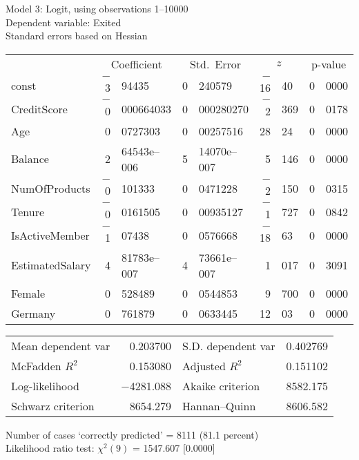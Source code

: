 \documentclass[11pt]{article}
\begin{document}
\thispagestyle{empty}

\begin{center}

Model 3: Logit, using observations 1--10000\\
Dependent variable: Exited\\
Standard errors based on Hessian

\vspace{1em}

\begin{tabular}{lr@{.}lr@{.}lr@{.}lr@{.}l}
  &
 \multicolumn{2}{c}{Coefficient} &
  \multicolumn{2}{c}{Std.\ Error} &
   \multicolumn{2}{c}{$z$} &
    \multicolumn{2}{c}{p-value} \\[1ex]
const &
  $-$3&94435 &
    0&240579 &
      $-$16&40 &
        0&0000 \\
CreditScore &
  $-$0&000664033 &
    0&000280270 &
      $-$2&369 &
        0&0178 \\
Age &
  0&0727303 &
    0&00257516 &
      28&24 &
        0&0000 \\
Balance &
  2&64543\textrm{e--006} &
    5&14070\textrm{e--007} &
      5&146 &
        0&0000 \\
NumOfProducts &
  $-$0&101333 &
    0&0471228 &
      $-$2&150 &
        0&0315 \\
Tenure &
  $-$0&0161505 &
    0&00935127 &
      $-$1&727 &
        0&0842 \\
IsActiveMember &
  $-$1&07438 &
    0&0576668 &
      $-$18&63 &
        0&0000 \\
EstimatedSalary &
  4&81783\textrm{e--007} &
    4&73661\textrm{e--007} &
      1&017 &
        0&3091 \\
Female &
  0&528489 &
    0&0544853 &
      9&700 &
        0&0000 \\
Germany &
  0&761879 &
    0&0633445 &
      12&03 &
        0&0000 \\
\end{tabular}

\vspace{1ex}
\begin{tabular}{lrlr}
Mean dependent var &  0.203700 & S.D. dependent var &  0.402769 \\
McFadden $R^2$ &  0.153080 & Adjusted $R^2$ &  0.151102 \\
Log-likelihood & $-$4281.088 & Akaike criterion &  8582.175 \\
Schwarz criterion &  8654.279 & Hannan--Quinn &  8606.582 \\
\end{tabular}


\vspace{1ex}
\vspace{1em}
\begin{raggedright}
Number of cases `correctly predicted' = 8111 (81.1 percent)\\
Likelihood ratio test: $\chi^2(9)$ = 1547.607 [0.0000]\\
\end{raggedright}

\end{center}
\end{document}
